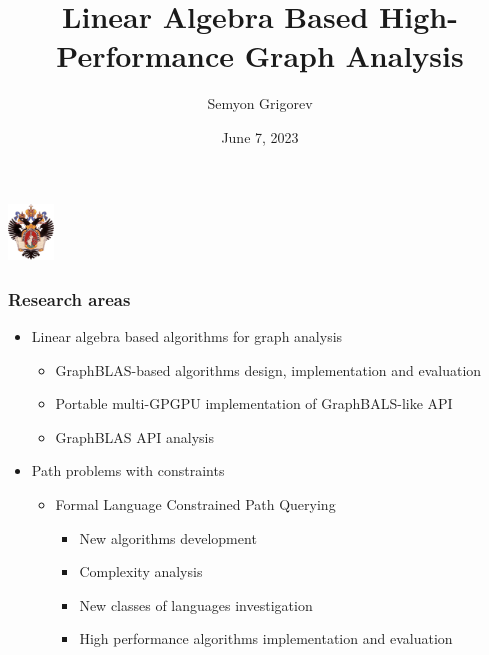 \documentclass[xcolor=table,aspectratio=169]{beamer}
\title[High-Performance Graph Analysis]{Linear Algebra Based High-Performance Graph Analysis}
\institute[SPbSU]{
Saint Petersburg State University
}
\author[Semyon Grigorev]{Semyon Grigorev}
\date{June 7, 2023}
\begin{document}
{
\begin{frame}[fragile]
  \begin{table}
  \centering
  \includegraphics[height=1.5cm]{pictures/SPbGU_Logo.png}
  \end{table}
  \titlepage
\end{frame}
}


\begin{frame}[fragile]
  \frametitle{Research areas}
  \begin{itemize}
    \item Linear algebra based algorithms for graph analysis
    \begin{itemize}
      \item GraphBLAS-based algorithms design, implementation and evaluation
      \item Portable multi-GPGPU implementation of GraphBALS-like API
      \item GraphBLAS API analysis
    \end{itemize} 
    \item Path problems with constraints
    \begin{itemize}
      \item Formal Language Constrained Path Querying
      \begin{itemize}
        \item New algorithms development
        \item Complexity analysis
        \item New classes of languages investigation
        \item High performance algorithms implementation and evaluation 
      \end{itemize}
    \end{itemize}
  \end{itemize}
\end{frame}
\end{document}
